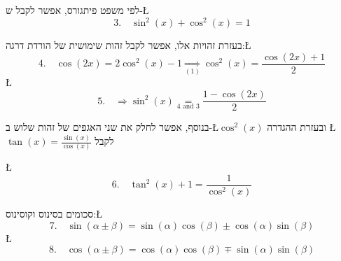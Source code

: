 \documentclass[english,hebrew]{article}
\begin{document}
לפי משפט פיתגורס, אפשר לקבל ש-\L{%
\[
3.\quad\sin^{2}(x)+\cos^{2}(x)=1
\]
}%

בעזרת זהויות אלו, אפשר לקבל זהות שימושית של הורדת דרגה:\L{%
\[
4.\quad\cos\left(2x\right)=2\cos^{2}(x)-1\underset{(1)}{\Rightarrow}\cos^{2}(x)=\frac{\cos(2x)+1}{2}
\]
}%
\L{%
\[
5.\quad\Rightarrow\sin^{2}(x)\underset{4\text{ and }3}{=}\frac{1-\cos(2x)}{2}
\]
}%

בנוסף, אפשר לחלק את שני האגפים של זהות שלוש ב-\L{$\cos^{2}(x)$} ובעזרת
ההגדרה \L{$\tan(x)=\frac{\sin(x)}{\cos(x)}$} לקבל

\L{%
\[
6.\quad\tan^{2}(x)+1=\frac{1}{\cos^{2}(x)}
\]
}%

סכומים בסינוס וקוסינוס:\L{%
\[
7.\quad\sin(\alpha\pm\beta)=\sin(\alpha)\cos(\beta)\pm\cos(\alpha)\sin(\beta)
\]
}%
\L{%
\[
8.\quad\cos(\alpha\pm\beta)=\cos(\alpha)\cos(\beta)\mp\sin(\alpha)\sin(\beta)
\]
}%
\end{document}
